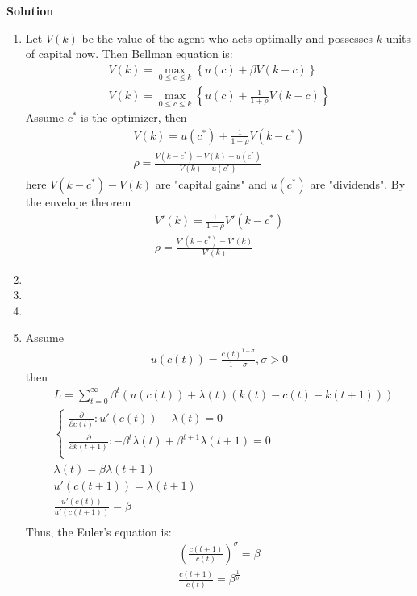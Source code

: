 \documentclass[a4paper]{article}
\begin{document}
\textbf{Solution}

\begin{enumerate}
	\item Let $V(k)$ be the value of the agent who acts optimally and possesses $k$ units of capital now. Then Bellman equation is:
	\begin{align*}
	V(k) = \underset{0 \le c \le k}{\max}\left\{u(c) + \beta V(k - c)\right\} \\
	V(k) = \underset{0 \le c \le k}{\max}\left\{u(c) + \frac{1}{1+\rho} V(k - c)\right\} 
	\end{align*}
	Assume $c^*$ is the optimizer, then
	\begin{align*}
	V(k) = u(c^*) + \frac{1}{1+\rho}V(k-c^*)\\
	\rho = \frac{V(k - c^*) - V(k) + u(c^*)}{V(k) - u(c^*)}
	\end{align*}
	here $V(k-c^*) - V(k)$ are "capital gains" and $u(c^*)$ are "dividends". By the envelope theorem
	\begin{align*}
	V'(k) = \frac{1}{1+\rho}V'(k-c^*)\\
	\rho = \frac{V'(k-c^*) - V'(k)}{V'(k)}
	\end{align*}
	\item 
	\item 
	\item 
	\item Assume 
	\begin{align*}
	u(c(t)) = \frac{c(t)^{1 - \sigma}}{1 - \sigma}, \sigma > 0
\end{align*}
then
\begin{align*}
&L = \sum_{t=0}^{\infty} \beta^t(u(c(t)) + \lambda(t)(k(t) - c(t) - k(t+1)))\\
&\begin{cases}\frac{\partial}{\partial c(t)}: u'(c(t)) - \lambda(t) = 0\\
\frac{\partial}{\partial k(t+1)}: -\beta^t \lambda(t) + \beta^{t+1}\lambda(t+1) = 0\\
\end{cases}\\
&\lambda(t) = \beta \lambda(t+1)\\
&u'(c(t+1)) = \lambda(t+1)\\
&\frac{u'(c(t))}{u'(c(t+1))} = \beta\\
\end{align*}
Thus, the Euler's equation is:
\begin{align*}
\left(\frac{c(t+1)}{c(t)}\right)^{\sigma} = \beta\\
\frac{c(t+1)}{c(t)} = \beta^{\frac{1}{\sigma}}

\end{align*}
\end{enumerate}
\end{document}
